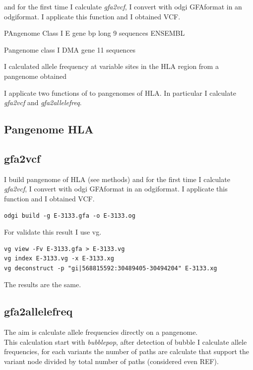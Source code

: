 and for the first time I calculate \textit{gfa2vcf}, I convert with odgi GFAformat in an odgiformat. I applicate this function and I obtained VCF.



PAngenome Class I E gene  bp long 9 sequences  ENSEMBL

Pangenome class I DMA gene 11 sequences

I calculated allele frequency at variable sites in the HLA region from a pangenome obtained 


I applicate two functions of \vgp to pangenomes of HLA. In particular I calculate \textit{gfa2vcf} and \textit{gfa2allelefreq}.

\subsection{Pangenome HLA}

\subsection{gfa2vcf}

I build pangenome of HLA (see methods) and for the first time I calculate \textit{gfa2vcf}, I convert with odgi GFAformat in an odgiformat. I applicate this function and I obtained VCF.

\begin{verbatim}
odgi build -g E-3133.gfa -o E-3133.og
\end{verbatim}

For validate this result I use vg.
\begin{verbatim}
vg view -Fv E-3133.gfa > E-3133.vg
vg index E-3133.vg -x E-3133.xg
vg deconstruct -p "gi|568815592:30489405-30494204" E-3133.xg
\end{verbatim}

The results are the same.

\subsection{gfa2allelefreq}

The aim is calculate allele frequencies directly on a pangenome. \\

This calculation start with \textit{bubblepop}, after detection of  bubble I calculate allele frequencies, for each variants the number of paths are calculate that support the variant node divided by total number of paths (considered even REF).\\

